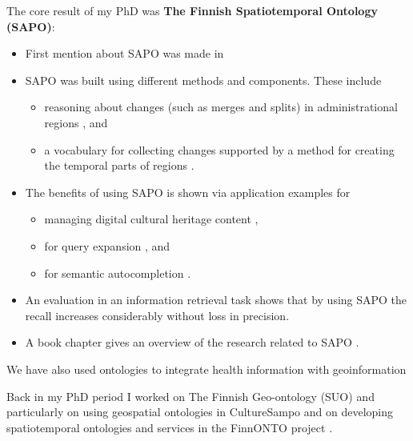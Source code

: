 \documentclass[11pt,letterpaper]{article}
\begin{document}
The core result of my PhD \cite{kauppinen-dissertation-2010} was \textbf{The Finnish Spatiotemporal Ontology (SAPO)}:
\begin{itemize}
\item First mention about SAPO was made in
\cite{kauppinen-hyvonen-bridging-the-semantic-2004}
\item SAPO was built
using different methods and components. These
include
\begin{itemize}
  \item reasoning about changes (such as merges and splits) in
administrational regions
\cite{kauppinen-ontology-time-series-book-2007} \cite{kauppinen-hyvonen-modeling-coverage-between-2005}
		\cite{kauppinen-geospatialreasoning-ijcai05}
		, and
\item a vocabulary for
		collecting changes supported by a method for creating the temporal parts of
		regions \cite{kauppinen-et-al-ontology-time-series-2008}.
\end{itemize}
\item The benefits of
		using SAPO is shown via application examples for
\begin{itemize}		\item managing digital cultural
		heritage content
		\cite{kauppinen-et-al-geospatio-temporal-2010},
		\item for query expansion
		\cite{tuominen-et-al-onki-query-expansion-2009}, and
\item for semantic
autocompletion \cite{sinkkila-et-al-irma-2008}. \end{itemize}
\item An evaluation in
		an information retrieval task shows
		\cite{kauppinen-et-al-geospatio-temporal-2010} that by using SAPO the recall
		increases considerably without loss in precision.
		\item A book chapter gives an
		overview of the research related to SAPO \cite{sapo-in-book-2011}.
\end{itemize}

We have also used ontologies to integrate health information with
  geoinformation
  		\cite{info:doi/10.2196/medinform.3531} \cite{geo-health-2012}


Back in my PhD period I worked on The Finnish Geo-ontology (SUO)
		\cite{henriksson-kauppinen-hyvonen-suo-2008}
		\cite{kauppinen-et-al-spatiotemporal-2008}
		\cite{kauppinen-et-al-ontology-based-modeling-and-visualization-2006}
and particularly on using geospatial ontologies in CultureSampo
		\cite{kauppinen-et-al-geospatio-temporal-2010}
		\cite{kauppinen-deichstetter-hyvonen-temp-o-map2007}
		\cite{hyvonen-et-al-culturesampo-dh-jac-2009}
		\cite{hyvonen-et-al-culsa-mw-2009}
		\cite{hyvonen-et-al-culturesampo-dh-jac-2009}
		\cite{hyvonen-Kultuuurisampo-2008}
		\cite{hyvonen-et-al-culturesampo}
		\cite{CultureSampo2006}
				\cite{culturesampo-2007}
and on developing spatiotemporal ontologies and services \cite{kauppinen-et-al-spatiotemporal-2008}
		\cite{onkigeo-2007}	in the FinnONTO project \cite{hyvonen-et-al-elements-2007}
		\cite{ruotsalo-et-al-signum-2008}
		\cite{hyvonen-valo-et-al-creating-a-national-2005}
		\cite{hyvonen-valo-et-al-finnish-national-2005}
		\cite{makela-viljanen-et-al-semantic-web-widgets}
		\cite{ajax-2009}.
\end{document}
